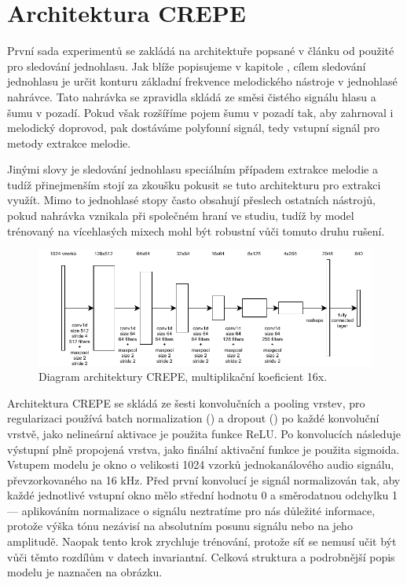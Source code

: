 \section{Architektura CREPE}\label{sec:crepe}

První sada experimentů se zakládá na architektuře popsané v článku od \cite{Kim2018} použité pro sledování jednohlasu. Jak blíže popisujeme v kapitole , cílem sledování jednohlasu je určit konturu základní frekvence melodického nástroje v jednohlasé nahrávce. Tato nahrávka se zpravidla skládá ze směsi čistého signálu hlasu a šumu v pozadí. Pokud však rozšíříme pojem šumu v pozadí tak, aby zahrnoval i melodický doprovod, pak dostáváme polyfonní signál, tedy vstupní signál pro metody extrakce melodie.

Jinými slovy je sledování jednohlasu speciálním případem extrakce melodie a tudíž přinejmenším stojí za zkoušku pokusit se tuto architekturu pro extrakci využít. Mimo to jednohlasé stopy často obsahují přeslech ostatních nástrojů, pokud nahrávka vznikala při společném hraní ve studiu, tudíž by model trénovaný na vícehlasých mixech mohl být robustní vůči tomuto druhu rušení. 

\begin{figure}[h]\centering
\includegraphics[width=\textwidth,height=\textheight,keepaspectratio]{../img/crepe_arch}
\caption{Diagram architektury CREPE, multiplikační koeficient 16x.}
\label{obr:wavenet_dilated}
\end{figure}

Architektura CREPE se skládá ze šesti konvolučních a pooling vrstev, pro regularizaci používá batch normalization (\cite{Ioffe2015}) a dropout (\cite{Sutskever2014}) po každé konvoluční vrstvě, jako nelineární aktivace je použita funkce ReLU. Po konvolucích následuje výstupní plně propojená vrstva, jako finální aktivační funkce je použita sigmoida. Vstupem modelu je okno o velikosti 1024 vzorků jednokanálového audio signálu, převzorkovaného na 16 kHz. Před první konvolucí je signál normalizován tak, aby každé jednotlivé vstupní okno mělo střední hodnotu 0 a směrodatnou odchylku 1 --- aplikováním normalizace o signálu neztratíme pro nás důležité informace, protože výška tónu nezávisí na absolutním posunu signálu nebo na jeho amplitudě. Naopak tento krok zrychluje trénování, protože síť se nemusí učit být vůči těmto rozdílům v datech invariantní. Celková struktura a podrobnější popis modelu je naznačen na obrázku.

